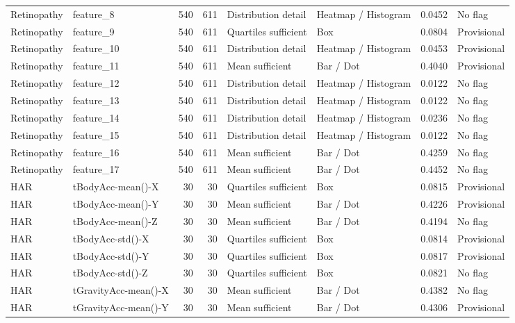 \begin{longtable}{>{\raggedright\arraybackslash}p{2.5cm}>{\raggedright\arraybackslash}p{4.5cm}rr>{\raggedright\arraybackslash}p{3.0cm}>{\raggedright\arraybackslash}p{4.0cm}rp{2.0cm}}
Retinopathy\cite{retina} & feature\_8 & 540 & 611 & Distribution detail & Heatmap / Histogram & 0.0452 & No flag\\
Retinopathy\cite{retina} & feature\_9 & 540 & 611 & Quartiles sufficient & Box & 0.0804 & Provisional\\
Retinopathy\cite{retina} & feature\_10 & 540 & 611 & Distribution detail & Heatmap / Histogram & 0.0453 & Provisional\\
Retinopathy\cite{retina} & feature\_11 & 540 & 611 & Mean sufficient & Bar / Dot & 0.4040 & Provisional\\
Retinopathy\cite{retina} & feature\_12 & 540 & 611 & Distribution detail & Heatmap / Histogram & 0.0122 & No flag\\
Retinopathy\cite{retina} & feature\_13 & 540 & 611 & Distribution detail & Heatmap / Histogram & 0.0122 & No flag\\
Retinopathy\cite{retina} & feature\_14 & 540 & 611 & Distribution detail & Heatmap / Histogram & 0.0236 & No flag\\
Retinopathy\cite{retina} & feature\_15 & 540 & 611 & Distribution detail & Heatmap / Histogram & 0.0122 & No flag\\
Retinopathy\cite{retina} & feature\_16 & 540 & 611 & Mean sufficient & Bar / Dot & 0.4259 & No flag\\
Retinopathy\cite{retina} & feature\_17 & 540 & 611 & Mean sufficient & Bar / Dot & 0.4452 & No flag\\
HAR\cite{har} & tBodyAcc-mean()-X & 30 & 30 & Quartiles sufficient & Box & 0.0815 & Provisional\\
HAR\cite{har} & tBodyAcc-mean()-Y & 30 & 30 & Mean sufficient & Bar / Dot & 0.4226 & Provisional\\
HAR\cite{har} & tBodyAcc-mean()-Z & 30 & 30 & Mean sufficient & Bar / Dot & 0.4194 & No flag\\
HAR\cite{har} & tBodyAcc-std()-X & 30 & 30 & Quartiles sufficient & Box & 0.0814 & Provisional\\
HAR\cite{har} & tBodyAcc-std()-Y & 30 & 30 & Quartiles sufficient & Box & 0.0817 & Provisional\\
HAR\cite{har} & tBodyAcc-std()-Z & 30 & 30 & Quartiles sufficient & Box & 0.0821 & No flag\\
HAR\cite{har} & tGravityAcc-mean()-X & 30 & 30 & Mean sufficient & Bar / Dot & 0.4382 & No flag\\
HAR\cite{har} & tGravityAcc-mean()-Y & 30 & 30 & Mean sufficient & Bar / Dot & 0.4306 & Provisional\\

\end{longtable}
